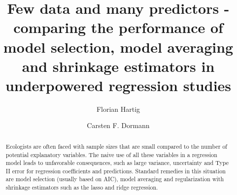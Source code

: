 \documentclass[5p]{elsarticle}
\begin{document}
\begin{frontmatter}



\title{Few data and many predictors - comparing the performance of model selection, model averaging and shrinkage estimators in underpowered regression studies}





\author[FR]{Florian Hartig}
\author[FR]{Carsten F. Dormann}

\address[FR]{University of Freiburg, Department of Biometry and Environmental System Analysis, Tennenbacherstrasse 4, 79106 Freiburg, Germany }





\begin{abstract}

Ecologists are often faced with sample sizes that are small compared to the number of potential explanatory variables. The naive use of all these variables in a regression model leads to unfavorable consequences, such as large variance, uncertainty and Type II error for regression coefficients and predictions. Standard remedies in this situation are model selection (usually based on AIC), model averaging and regularization with shrinkage estimators such as the lasso and ridge regression. 


\end{abstract}
\end{frontmatter}
\end{document}
